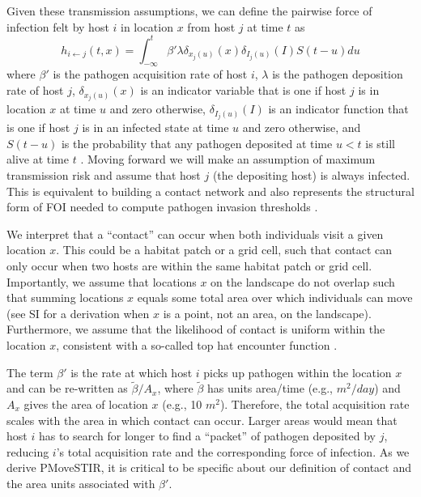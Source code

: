 \documentclass[letterpaper]{article}
\begin{document}
Given these transmission assumptions, we can define the pairwise force of infection felt by host $i$ in location $x$ from host $j$ at time $t$ as \citep{Wilber2022}
\begin{equation}
    h_{i \leftarrow j}(t, x) = \int_{-\infty}^{t} \beta' \lambda \delta_{x_j(u)}(x) \delta_{I_j(u)}(I) S(t - u) du
    \label{eq:original_foi}
\end{equation}
where $\beta'$ is the pathogen acquisition rate of host $i$, $\lambda$ is the pathogen deposition rate of host $j$, $\delta_{x_j(u)}(x)$ is an indicator variable that is one if host $j$ is in location $x$ at time $u$ and zero otherwise, $\delta_{I_j(u)}(I)$ is an indicator function that is one if host $j$ is in an infected state at time $u$ and zero otherwise, and $S(t-u)$ is the probability that any pathogen deposited at time $u < t$ is still alive at time $t$ \citep[see][for a full derivation]{Wilber2022}.  
Moving forward we will make an assumption of maximum transmission risk and assume that host $j$ (the depositing host) is always infected. 
This is equivalent to building a contact network and also represents the structural form of FOI needed to compute pathogen invasion thresholds \citep{Wilber2022}.

We interpret that a ``contact'' can occur when both individuals visit a given location $x$. This could be a habitat patch or a grid cell, such that contact can only occur when two hosts are within the same habitat patch or grid cell. 
Importantly, we assume that locations $x$ on the landscape do not overlap such that summing locations $x$ equals some total area over which individuals can move (see SI for a derivation when $x$ is a point, not an area, on the landscape). 
Furthermore, we assume that the likelihood of contact is uniform within the location $x$, consistent with a so-called top hat encounter function \citep{Gurarie2013,Wilber2022}.

The term $\beta'$ is the rate at which host $i$ picks up pathogen within the location $x$ and can be re-written as $\tilde{\beta} / A_x$, where $\tilde{\beta}$ has units area/time (e.g., $m^2 / day$) and $A_x$ gives the area of location $x$ (e.g., 10 $m^2$). 
Therefore, the total acquisition rate scales with the area in which contact can occur. Larger areas would mean that host $i$ has to search for longer to find a ``packet'' of pathogen deposited by $j$, reducing $i$'s total acquisition rate and the corresponding force of infection.
As we derive PMoveSTIR, it is critical to be specific about our definition of contact and the area units associated with $\beta'$.  
\end{document}
